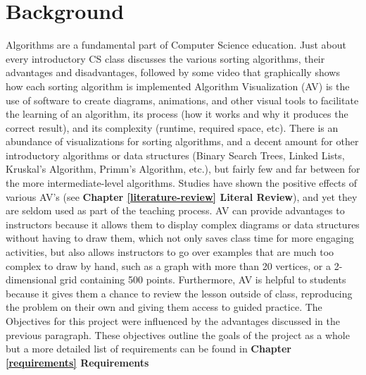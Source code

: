 \section{Background}
\label{introduction}
Algorithms are a fundamental part of Computer Science education. 
Just about every introductory CS class discusses the various sorting algorithms, 
their advantages and disadvantages, followed by some video that graphically 
shows how each sorting algorithm is implemented
\newline\newline
Algorithm Visualization (AV) is the use of software 
to create diagrams, animations, and other visual tools 
to facilitate the learning of an algorithm, 
its process (how it works and why it produces the correct result), 
and its complexity (runtime, required space, etc).
There is an abundance of visualizations for sorting algorithms,
and a decent amount for other introductory algorithms or data structures
(Binary Search Trees, Linked Lists, Kruskal's Algorithm, Primm's Algorithm, etc.),
but fairly few and far between for the more intermediate-level algorithms. 
\newline\newline
Studies have shown the positive effects of various AV's 
(see {\textbf{Chapter \ref{literature-review} Literal Review}}),
and yet they are seldom used as part of the teaching process.
AV can provide advantages to instructors because it allows them to 
display complex diagrams or data structures without having to draw them, 
which not only saves class time for more engaging activities, but also
allows instructors to go over examples that are 
much too complex to draw by hand, such as a graph with more than 20 vertices, 
or a 2-dimensional grid containing 500 points. 
Furthermore, AV is helpful to students because it gives them a chance to 
review the lesson outside of class, reproducing the problem on their own
and giving them access to guided practice. 
\newline\newline
The Objectives for this project were influenced by the advantages discussed in the previous paragraph. 
These objectives outline the goals of the project as a whole but 
a more detailed list of requirements can be found in
\textbf{Chapter \ref{requirements} Requirements}
